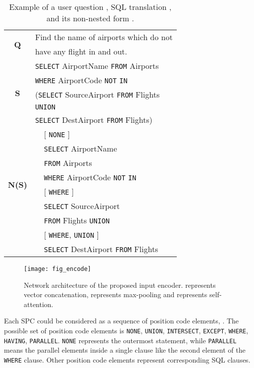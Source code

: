 \documentclass[11pt,a4paper]{article}
\begin{document}
\begin{table}
\centering
\begin{tabular}{|c|c|l|} \hline
\multirow{2}{*}{\textbf{Q}} &\multicolumn{2}{l|}{ Find the name of airports which do not  } \\
&\multicolumn{2}{l|}{have any flight in and out.}\\ \hline
\multirow{5}{*}{\textbf{S}} &\multicolumn{2}{l|}{ \texttt{SELECT} AirportName \texttt{FROM} Airports } \\
&\multicolumn{2}{l|}{ \texttt{WHERE} AirportCode \texttt{NOT} \texttt{IN} } \\
&\multicolumn{2}{l|}{ (\texttt{SELECT} SourceAirport \texttt{FROM} Flights }\\
&\multicolumn{2}{l|}{ \texttt{UNION} } \\
&\multicolumn{2}{l|}{ \texttt{SELECT} DestAirport \texttt{FROM} Flights) }\\ \hline
\multirow{8}{*}{\textbf{N(S)}}&&[ \texttt{NONE} ] \\  \cline{2-3}
&\multirow{3}{*}{}& \texttt{SELECT} AirportName \\
 & & \texttt{FROM} Airports\\ 
  & & \texttt{WHERE} AirportCode \texttt{NOT} \texttt{IN}  \\ \cline{2-3}
&& [ \texttt{WHERE} ] \\ \cline{2-3}
&\multirow{2}{*}{}&\texttt{SELECT} SourceAirport \\ 
& & \texttt{FROM} Flights \texttt{UNION} \\ \cline{2-3}
&&[ \texttt{WHERE}, \texttt{UNION} ] \\ \cline{2-3}
&&\texttt{SELECT} DestAirport \texttt{FROM} Flights \\ \hline
\end{tabular}
\caption{Example of a user question , SQL translation , and its non-nested form .}
\label{tbl:ex}
\end{table}

\begin{figure*}
\centering
\texttt{[image: fig\_encode]}
\caption{Network architecture of the proposed input encoder.  represents vector concatenation,  represents max-pooling and  represents self-attention.}
\label{fig:encode}
\end{figure*}

Each SPC  could be considered as a sequence of  position code elements, . The possible set of position code elements is \texttt{NONE}, \texttt{UNION}, \texttt{INTERSECT}, \texttt{EXCEPT}, \texttt{WHERE}, \texttt{HAVING}, \texttt{PARALLEL}. \texttt{NONE} represents the outermost statement, while \texttt{PARALLEL} means the parallel elements inside a single clause like the second element of the \texttt{WHERE} clause. Other position code elements represent corresponding SQL clauses.
\end{document}
